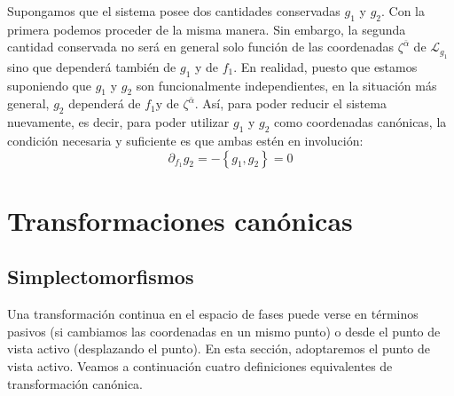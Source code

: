 Supongamos que el sistema posee dos cantidades conservadas $g_{1}$ y $g_{2}$. Con la primera podemos proceder de la misma manera. Sin embargo, la segunda cantidad conservada no será en general solo función de las coordenadas $\zeta^{\bar{\alpha}}$ de $\mathscr{L}_{g_{1}}$ sino que dependerá también de $g_{1}$ y de $f_{1}$. En realidad, puesto que estamos suponiendo que $g_{1}$ y $g_{2}$ son funcionalmente independientes, en la situación más general, $g_{2}$ dependerá de $f_{1} \mathrm{y}$ de $\zeta^{\bar{\alpha}}$. Así, para poder reducir el sistema nuevamente, es decir, para poder utilizar $g_{1}$ y $g_{2}$ como coordenadas canónicas, la condición necesaria y suficiente es que ambas estén en involución:
$$
\partial_{f_{1}} g_{2}=-\left\{g_{1}, g_{2}\right\}=0
$$
\section{Transformaciones canónicas}
\subsection{Simplectomorfismos}
Una transformación continua en el espacio de fases puede verse en términos pasivos (si cambiamos las coordenadas en un mismo punto) o desde el punto de vista activo (desplazando el punto). En esta sección, adoptaremos el punto de vista activo. Veamos a continuación cuatro definiciones equivalentes de transformación canónica.

